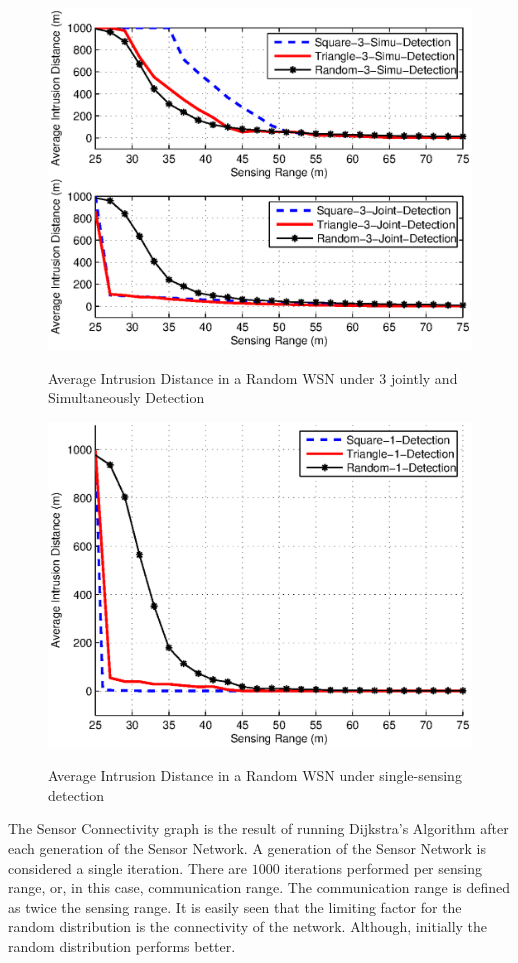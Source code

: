 \documentclass[10pt, conference, compsocconf, twocolumn]{IEEEtran}
\begin{document}
\begin{figure}
  \includegraphics[width= 3.2 in]{AveIntruDistance_RanTriSquare_3_Simu_Joint.eps}\\
  \caption{Average Intrusion Distance in a Random WSN under $3$ jointly and Simultaneously Detection}\label{AveIntruDistance_RanTriSquare_3_Simu_Joint.eps}
\end{figure}

\begin{figure}
  \includegraphics[width= 3.2 in]{AveIntruDistance_RanTriSquare_SingleDetection.eps}\\
  \caption{Average Intrusion Distance in a Random WSN under single-sensing detection}\label{AveIntruDistance_RanTriSquare_SingleDetection.eps}
\end{figure}



The Sensor Connectivity graph is the result of running Dijkstra's
Algorithm after each generation of the Sensor Network.  A generation
of the Sensor Network is considered a single iteration.  There are
$1000$ iterations performed per sensing range, or, in this case,
communication range.  The communication range is defined as twice
the sensing range.  It is easily seen that the limiting factor for
the random distribution is the connectivity of the network.
Although, initially the random distribution performs better.
\end{document}
